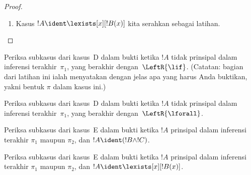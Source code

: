 \documentclass[../../../include/open-logic-section]{subfiles}
\begin{document}
\begin{proof}
\begin{enumerate}
!!{proof}~$\pi_1'$ mempunyai sekuen akhir $\Gamma \Sequent \Delta, !B(c)$,
dengan $c$ sebagai eigenvariabel inferensi~$\RightR{\lforall}$. Jadi, $c$
tidak muncul dalam~$!B(x)$, $\Gamma$, atau~$\Delta$. Kita mengasumsikan
!!{proof}~$\pi$ reguler, sehingga $c$ menjadi eigenvariabel hanya bagi
inferensi~$\RightR{\lforall}$ berikut ini dan hanya muncul di atasnya,
yakni hanya muncul dalam~$\pi_1'$ dan bukan eigenvariabel suatu inferensi
dalam~$\pi_1'$. Karena $c$ tidak muncul dalam~$\pi_2$, ia tidak mungkin
muncul dalam~$t$. Menurut ,
!!{proof}~$\Subst{\pi_1'}{t}{c}$ adalah !!a{proof} dari $\Gamma \Sequent
\Delta, !B(t)$. Sekarang kita menerapkan hipotesis induksi pada !!{proof}
\[
\AxiomC{}
\RightLabel{$\Subst{\pi_1'}{t}{c}$}
\Deduce$\Gamma \fCenter \Delta, !B(t)$
\AxiomC{}
\RightLabel{$\pi_2''$}
\Deduce$!B(t), \Gamma \fCenter \Delta$
\RightLabel{\CutCS}
\BinaryInf$\Gamma \fCenter \Delta$
\DisplayProof
\]
(Hipotesis induksi berlaku karena !!{formula} potongannya adalah~$!B(t)$,
sehingga !!{proof} tersebut mempunyai peringkat potongan lebih rendah
daripada~$\pi$.)
\item Kasus $!A \ident \lexists[x][!B(x)]$ kita serahkan sebagai latihan.
\end{enumerate}
\end{proof}

\begin{prob}
Periksa subkasus dari kasus~D dalam bukti  ketika
$!A$ tidak prinsipal dalam inferensi terakhir~$\pi_1$, yang berakhir
dengan~$\LeftR{\lif}$. (Catatan: bagian dari latihan ini ialah menyatakan
dengan jelas apa yang harus Anda buktikan, yakni bentuk $\pi$ dalam kasus
ini.)
\end{prob}

\begin{prob}
Periksa subkasus dari kasus~D dalam bukti  ketika
$!A$ tidak prinsipal dalam inferensi terakhir~$\pi_1$, yang berakhir
dengan~$\LeftR{\lforall}$.
\end{prob}

\begin{prob}
Periksa subkasus dari kasus~E dalam bukti  ketika
$!A$ prinsipal dalam inferensi terakhir $\pi_1$ maupun $\pi_2$, dan
$!A \ident (!B \land !C)$.
\end{prob}

\begin{prob}
Periksa subkasus dari kasus~E dalam bukti  ketika
$!A$ prinsipal dalam inferensi terakhir $\pi_1$ maupun $\pi_2$, dan
$!A \ident \lexists[x][!B(x)]$.
\end{prob}
\end{document}
